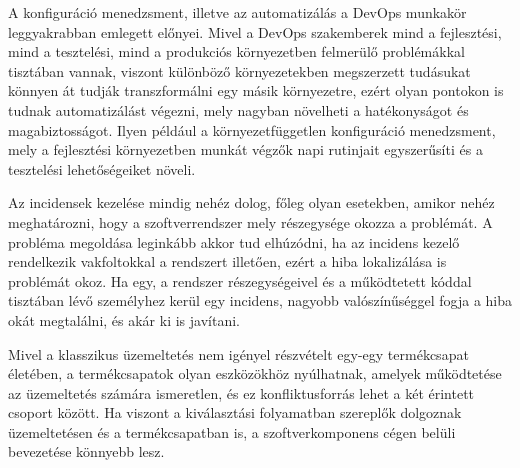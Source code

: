 A konfiguráció menedzsment, illetve az automatizálás a DevOps munkakör leggyakrabban emlegett előnyei. Mivel a DevOps szakemberek mind a fejlesztési, mind a tesztelési, mind a produkciós környezetben felmerülő problémákkal tisztában vannak, viszont különböző környezetekben megszerzett tudásukat könnyen át tudják transzformálni egy másik környezetre, ezért olyan pontokon is tudnak automatizálást végezni, mely nagyban növelheti a hatékonyságot és magabiztosságot. Ilyen például a környezetfüggetlen konfiguráció menedzsment, mely a fejlesztési környezetben munkát végzők napi rutinjait egyszerűsíti és a tesztelési lehetőségeiket növeli.

Az incidensek kezelése mindig nehéz dolog, főleg olyan esetekben, amikor nehéz meghatározni, hogy a szoftverrendszer mely részegysége okozza a problémát. A probléma megoldása leginkább akkor tud elhúzódni, ha az incidens kezelő rendelkezik vakfoltokkal a rendszert illetően, ezért a hiba lokalizálása is problémát okoz.
Ha egy, a rendszer részegységeivel és a működtetett kóddal tisztában lévő személyhez kerül egy incidens, nagyobb valószínűséggel fogja a hiba okát megtalálni, és akár ki is javítani.

Mivel a klasszikus üzemeltetés nem igényel részvételt egy-egy termékcsapat életében, a termékcsapatok olyan eszközökhöz nyúlhatnak, amelyek működtetése az üzemeltetés számára ismeretlen, és ez konfliktusforrás lehet a két érintett csoport között. Ha viszont a kiválasztási folyamatban szereplők dolgoznak üzemeltetésen és a termékcsapatban is, a szoftverkomponens cégen belüli bevezetése könnyebb lesz.